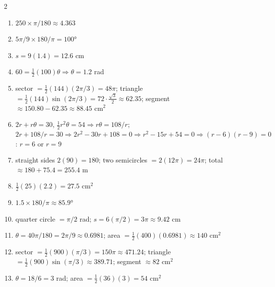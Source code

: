 \documentclass[11pt]{article}
\begin{document}
\begin{keybox}
\begin{multicols}{2}
\small
\begin{enumerate}[leftmargin=*,itemsep=3pt]
  \item $250\times\pi/180\approx4.363$
  \item $5\pi/9\times180/\pi=100°$
  \item $s=9(1.4)=12.6$ cm
  \item $60=\tfrac12(100)\theta\Rightarrow\theta=1.2$ rad
  \item sector $=\tfrac12(144)(2\pi/3)=48\pi$; triangle $=\tfrac12(144)\sin(2\pi/3)=72\cdot\tfrac{\sqrt3}2\approx62.35$; segment $\approx150.80-62.35\approx88.45\text{ cm}^2$
  \item $2r+r\theta=30$, $\tfrac12r^2\theta=54\Rightarrow r\theta=108/r$; $2r+108/r=30\Rightarrow2r^2-30r+108=0\Rightarrow r^2-15r+54=0\Rightarrow(r-6)(r-9)=0$: $r=6$ or $r=9$
  \item straight sides $2(90)=180$; two semicircles $=2(12\pi)=24\pi$; total $\approx180+75.4=255.4$ m
  \item $\tfrac12(25)(2.2)=27.5\text{ cm}^2$
  \item $1.5\times180/\pi\approx85.9°$
  \item quarter circle $=\pi/2$ rad; $s=6(\pi/2)=3\pi\approx9.42$ cm
  \item $\theta=40\pi/180=2\pi/9\approx0.6981$; area $=\tfrac12(400)(0.6981)\approx140\text{ cm}^2$
  \item sector $=\tfrac12(900)(\pi/3)=150\pi\approx471.24$; triangle $=\tfrac12(900)\sin(\pi/3)\approx389.71$; segment $\approx82\text{ cm}^2$
  \item $\theta=18/6=3$ rad; area $=\tfrac12(36)(3)=54\text{ cm}^2$
\end{enumerate}
\end{multicols}
\end{keybox}
\end{document}
